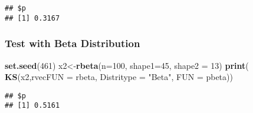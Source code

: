 \documentclass[]{article}
\newenvironment{Shaded}{\begin{snugshade}}{\end{snugshade}}
\newcommand{\DataTypeTok}[1]{\textcolor[rgb]{0.13,0.29,0.53}{#1}}
\newcommand{\DecValTok}[1]{\textcolor[rgb]{0.00,0.00,0.81}{#1}}
\newcommand{\KeywordTok}[1]{\textcolor[rgb]{0.13,0.29,0.53}{\textbf{#1}}}
\newcommand{\NormalTok}[1]{#1}
\newcommand{\StringTok}[1]{\textcolor[rgb]{0.31,0.60,0.02}{#1}}
\begin{document}
\begin{verbatim}
## $p
## [1] 0.3167
\end{verbatim}

\hypertarget{test-with-beta-distribution}{%
\subsubsection{Test with Beta
Distribution}\label{test-with-beta-distribution}}

\begin{Shaded}
\begin{Highlighting}[]
\KeywordTok{set.seed}\NormalTok{(}\DecValTok{461}\NormalTok{)}
\NormalTok{x2<-}\KeywordTok{rbeta}\NormalTok{(}\DataTypeTok{n=}\DecValTok{100}\NormalTok{, }\DataTypeTok{shape1=}\DecValTok{45}\NormalTok{, }\DataTypeTok{shape2 =} \DecValTok{13}\NormalTok{)}
\KeywordTok{print}\NormalTok{( }\KeywordTok{KS}\NormalTok{(x2,}\DataTypeTok{rvecFUN =}\NormalTok{ rbeta, }\DataTypeTok{Distritype =} \StringTok{"Beta"}\NormalTok{, }\DataTypeTok{FUN =}\NormalTok{ pbeta))}
\end{Highlighting}
\end{Shaded}

\begin{verbatim}
## $p
## [1] 0.5161
\end{verbatim}
\end{document}
